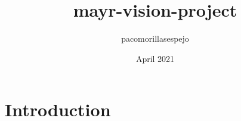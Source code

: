 \documentclass{article}
\title{mayr-vision-project}
\author{pacomorillasespejo }
\date{April 2021}
\begin{document}
\maketitle

\section{Introduction}
\end{document}

